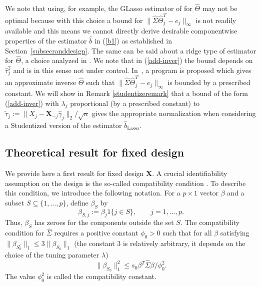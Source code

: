 \documentclass[aos,MSNbibl,dvips]{arximspdf}
\newcommand{\bx}{\mathbf{X}}
\begin{document}
We note that using, for example, the GLasso estimator of \cite
{friedman2008sparse} for $\hat{\Theta}$ may not be
optimal because with this choice a bound for $\| \hat\Sigma\hat
\Theta
_j^T - e_j \|_{\infty}$
is not readily available and this means we cannot directly derive
desirable componentwise properties of the estimator $\hat{b}$ in
(\ref{b1}) as established in Section~\ref{subsecranddesign}. The same
can be said about a ridge type of estimator for $\hat\Theta$, a choice
analyzed in \cite{pb12}.
We note that in (\ref{add-inver}) the bound depends on $\hat\tau_j^2$
and is in this sense not under control.
In~\cite{JavanmardMontanari13}, a program is proposed which gives an
approximate inverse $\hat\Theta$
such that $\| \hat\Sigma\hat\Theta_j^T - e_j \|_{\infty}$ is bounded
by a prescribed constant.
We will show in Remark \ref{studentizeremark} that a bound of the form
(\ref{add-inver}) with $\lambda_j$ proportional (by a prescribed
constant) to
$\tilde\tau_j:= \| X_j - \bx_{-j} \hat\gamma_j \|_2 /\sqrt n $ gives
the appropriate normalization when considering a Studentized
version of the estimator $\hat b_\mathrm{Lasso}$.


\subsection{Theoretical result for fixed design}\label{subsecfixeddesign}

We provide here a first result for fixed design $\bx$.
A crucial identifiability assumption on the design is the so-called
compatibility condition \cite{vandeGeer07a}.
To describe this condition, we introduce the following notation. For a
$p \times1$ vector $\beta$
and a subset $S \subseteq\{1,\ldots,p\}$, define $\beta_S$ by
%
\[
\beta_{S,j}:= \beta_j 1 \{ j \in S\},\qquad j=1,
\ldots,p.
\]
%
Thus, $\beta_S$ has zeroes for the components outside the set $S$. The
compatibility condition for $\hat\Sigma$ requires a positive constant
$\phi_0 > 0$ such that
for all $\beta$ satisfying $\|\beta_{S_0^c}\|_1 \le3 \|\beta_{S_0}\|
_1$ (the constant $3$
is relatively arbitrary, it depends on the choice of the tuning
parameter $\lambda$)
%
\[
\|\beta_{S_0}\|_1^2 \le{s_0}
\beta^T \hat{\Sigma} \beta/ \phi_0^2.
\]
%
The value $\phi_0^2$ is called the compatibility constant.
\end{document}
